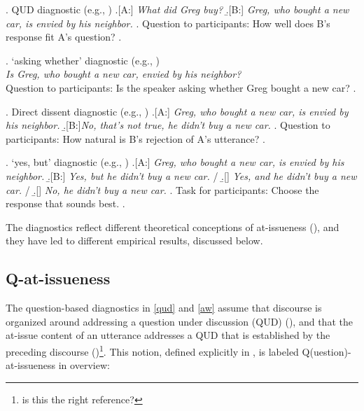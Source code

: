 \documentclass[12pt]{article}
\begin{document}
    \ex. \label{qud}%
      QUD diagnostic (e.g., \citealt{tonhauser_diagnosing_2012,chen_presuppositions_2024})
      \a.[A:] \emph{What did Greg buy?}
      \b.[B:] \emph{Greg, who bought a new car, is envied by his neighbor.}
      \z.
      Question to participants: How well does B's response fit A's question?
    \z.

    \ex. \label{aw}%
      `asking whether' diagnostic (e.g., \citealt{tonhauser_how_2018,solstad_cataphoric_2024})\smallskip\\
        \emph{Is Greg, who bought a new car, envied by his neighbor?}\smallskip
    \\ Question to participants: Is the speaker asking whether Greg bought a new car?
    \z.

    \ex. \label{dd} Direct dissent diagnostic (e.g., \citealt{tonhauser_diagnosing_2012,syrett_experimental_2015})
      \a.[A:] \emph{Greg, who bought a new car, is envied by his neighbor.}
      \b.[B:]\emph{No, that's not true, he didn't buy a new car.}
      \z.
    Question to participants: How natural is B's rejection of A's utterance?
    \z.

    \ex. \label{yesbut}%
      `yes, but' diagnostic (e.g., \citealt{xue_correlation_2011,destruel_cross-linguistic_2015})
      \a.[A:] \emph{Greg, who bought a new car, is envied by his neighbor.}
      \b.[B:] \emph{Yes, but he didn't buy a new car.} /
      \b.[] \emph{Yes, and he didn't buy a new car.} /
      \b.[] \emph{No, he didn't buy a new car.}
      \z.
      Task for participants: Choose the response that sounds best.
    \z.

    The diagnostics reflect different theoretical conceptions of at-issueness (\citealt{koev_notions_2018}), and they have led to different empirical results, discussed below.

  \subsection{Q-at-issueness}

    The question-based diagnostics in \ref{qud} and \ref{aw} assume that discourse is organized around addressing a question under discussion (QUD) (\citealt{roberts_information_1996,ginzburg_interrogatives_1996}), and that the at-issue content of an utterance addresses a QUD that is established by the preceding discourse (\citealt{amaral_review_2007})\footnote{is this the right reference?}. This notion, defined explicitly in \citealt{simons_what_2010}, is labeled Q(uestion)-at-issueness in  overview:
\end{document}

